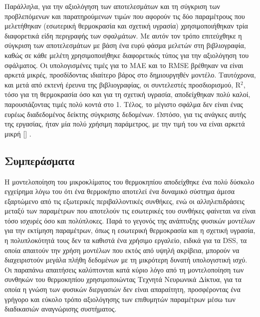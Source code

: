 \documentclass[12pt, a4paper]{report} %
\DeclareRobustCommand{\lcitep}[1]{%
  \english{[\cite{#1}]}%
}
\newcommand{\english}{\foreignlanguage{english}}
\begin{document}
Παράλληλα, για την αξιολόγηση των αποτελεσμάτων και τη σύγκριση των προβλεπόμενων και παρατηρούμενων τιμών που αφορούν 
τις δύο παραμέτρους που μελετήθηκαν (εσωτερική θερμοκρασία και σχετική υγρασία) χρησιμοποιήθηκαν τρία διαφορετικά είδη 
περιγραφής των σφαλμάτων. Με αυτόν τον τρόπο επιτεύχθηκε η σύγκριση των αποτελεσμάτων με βάση ένα ευρύ φάσμα μελετών στη 
βιβλιογραφία, καθώς σε κάθε μελέτη χρησιμοποιήθηκε διαφορετικός τύπος για την αξιολόγηση του σφάλματος. Οι υπολογισμένες 
τιμές για το \english{MAE} και το \english{RMSE} βρέθηκαν να είναι αρκετά μικρές, προσδίδοντας ιδιαίτερο βάρος στο 
δημιουργηθέν μοντέλο. Ταυτόχρονα, και μετά από εκτενή έρευνα της βιβλιογραφίας, οι συντελεστές προσδιορισμού, 
\english{R$^2$}, τόσο για τη θερμοκρασία όσο και για τη σχετική υγρασία, αποδείχθηκαν πολύ καλοί, παρουσιάζοντας τιμές 
πολύ κοντά στο 1. Τέλος, το μέγιστο σφάλμα δεν είναι ένας ευρέως διαδεδομένος δείκτης σύγκρισης δεδομένων. Ωστόσο, για 
τις ανάγκες αυτής της εργασίας, ήταν μία πολύ χρήσιμη παράμετρος, με την τιμή του να είναι αρκετά μικρή 
\lcitep{neural_bib21}.

\subsection{Συμπεράσματα}\label{sub_NN_conlusions}

Η μοντελοποίηση του μικροκλίματος του θερμοκηπίου αποδείχθηκε ένα πολύ δύσκολο εγχείρημα λόγω του ότι ένα θερμοκήπιο 
αποτελεί ένα δυναμικό σύστημα άμεσα εξαρτώμενο από τις εξωτερικές περιβαλλοντικές συνθήκες, ενώ οι αλληλεπιδράσεις 
μεταξύ των παραμέτρων που αποτελούν τις εσωτερικές του συνθήκες φαίνεται να είναι τόσο ισχυρές όσο και πολύπλοκες. 
Παρά το γεγονός της ανάπτυξης φυσικών μοντέλων για την εκτίμηση παραμέτρων, όπως η εσωτερική θερμοκρασία και η σχετική 
υγρασία, η πολυπλοκότητά τους δεν τα καθιστά ένα χρήσιμο εργαλείο, ειδικά για τα \english{DSS}, τα οποία απαιτούν 
την χρήση μοντέλων που εκτός από υψηλή ακρίβεια, μπορούν να διαχειριστούν μεγάλα πλήθη δεδομένων με τη μικρότερη δυνατή 
υπολογιστική ισχύ. Οι παραπάνω απαιτήσεις καλύπτονται κατά κύριο λόγο από τη μοντελοποίηση των συνθηκών του θερμοκηπίου 
χρησιμοποιώντας Τεχνητά Νευρωνικά Δίκτυα, για τα οποία η γνώση των φυσικών διεργασιών δεν είναι 
απαραίτητη, προσφέροντας ένα γρήγορο και εύκολο τρόπο αξιολόγησης των επιθυμητών παραμέτρων μέσω των διαδικασιών 
αναγνώρισης συστήματος.
\end{document}
